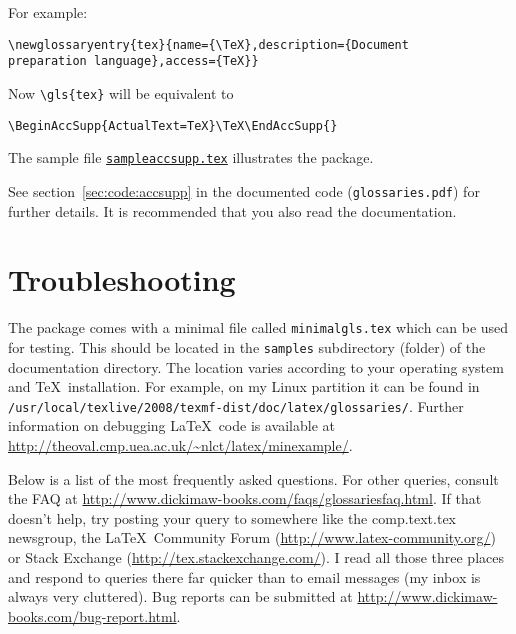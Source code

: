 \documentclass[report]{nlctdoc}
\newcommand*{\samplefile}[1]{\hyperref[ex:sample#1]{\texttt{sample#1.tex}}}
\begin{document}
For example:
\begin{verbatim}
\newglossaryentry{tex}{name={\TeX},description={Document 
preparation language},access={TeX}}
\end{verbatim}
Now \verb|\gls{tex}| will be equivalent to
\begin{verbatim}
\BeginAccSupp{ActualText=TeX}\TeX\EndAccSupp{}
\end{verbatim}
The sample file \samplefile{accsupp} illustrates the
 package.

See \ifpdf section~\ref*{sec:code:accsupp} in \fi the documented code
(\texttt{glossaries.pdf}) for further details. It is recommended
that you also read the  documentation. 

\chapter{Troubleshooting}
\label{sec:trouble}

The  package comes with a minimal file called 
\texttt{minimalgls.tex} which can be used for testing. This
should be located in the \texttt{samples} subdirectory (folder)
of the  documentation directory. The location
varies according to your operating system and \TeX\ installation.
For example, on my Linux partition it can be found in
\texttt{/usr/local/texlive/2008/texmf-dist\linebreak/doc/latex/glossaries/}. 
Further information on debugging \LaTeX\ code is available at
\url{http://theoval.cmp.uea.ac.uk/~nlct/latex/minexample/}.

Below is a list of the most frequently asked questions. For other
queries, consult the  FAQ at
\url{http://www.dickimaw-books.com/faqs/glossariesfaq.html}. If that
doesn't help, try posting your query to somewhere like the
comp.text.tex newsgroup, the \LaTeX\ Community Forum
(\url{http://www.latex-community.org/}) or Stack Exchange
(\url{http://tex.stackexchange.com/}). I read all those three places
and respond to queries there far quicker than to email messages (my
inbox is always very cluttered).
Bug reports can be submitted at
\url{http://www.dickimaw-books.com/bug-report.html}. 
\end{document}
